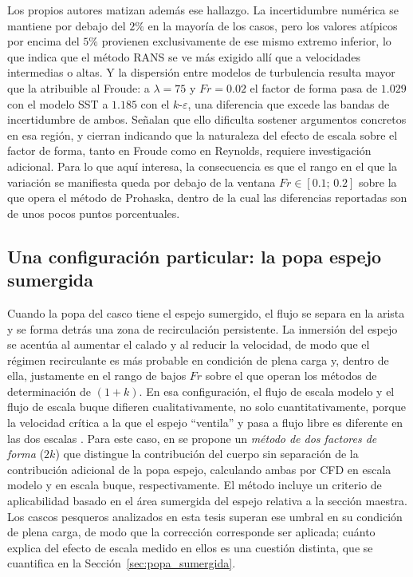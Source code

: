 Los propios autores matizan además ese hallazgo. La incertidumbre numérica se
mantiene por debajo del $2\%$ en la mayoría de los casos, pero los valores
atípicos por encima del $5\%$ provienen exclusivamente de ese mismo extremo
inferior, lo que indica que el método RANS se ve más exigido allí que a
velocidades intermedias o altas. Y la dispersión entre modelos de turbulencia
resulta mayor que la atribuible al Froude: a $\lambda = 75$ y $Fr = 0.02$ el
factor de forma pasa de $1.029$ con el modelo SST a $1.185$ con el
$k$-$\varepsilon$, una diferencia que excede las bandas de incertidumbre de ambos.
Señalan que ello dificulta sostener argumentos concretos en esa región, y cierran
indicando que la naturaleza del efecto de escala sobre el factor de forma, tanto
en Froude como en Reynolds, requiere investigación adicional. Para lo que aquí
interesa, la consecuencia es que el rango en el que la variación se manifiesta
queda por debajo de la ventana $Fr \in [0.1;\, 0.2]$ sobre la que opera el método
de Prohaska, dentro de la cual las diferencias reportadas son de unos pocos puntos porcentuales.

\subsection{Una configuración particular: la popa espejo sumergida}

Cuando la popa del casco tiene el espejo sumergido, el flujo se separa en la arista y se forma detrás una zona de recirculación persistente. La inmersión del espejo se acentúa al aumentar el calado y al reducir la velocidad, de modo que el régimen recirculante es más probable en condición de plena carga y, dentro de ella, justamente en el rango de bajos $Fr$ sobre el que operan los métodos de determinación de $(1+k)$. En esa configuración, el flujo de escala modelo y el flujo de escala buque difieren cualitativamente, no solo cuantitativamente, porque la velocidad crítica a la que el espejo ``ventila'' y pasa a flujo libre es diferente en las dos escalas \citep{ITTC_Combined_2021}. Para este caso, en \citet{korkmaz_wetted_transom} se propone un \emph{método de dos factores de forma} ($2k$) que distingue la contribución del cuerpo sin separación de la contribución adicional de la popa espejo, calculando ambas por CFD en escala modelo y en escala buque, respectivamente. El método incluye un criterio de aplicabilidad basado en el área sumergida del espejo relativa a la sección maestra. Los cascos pesqueros analizados en esta tesis superan ese umbral en su condición de plena carga, de modo que la corrección corresponde ser aplicada; cuánto explica del efecto de escala medido en ellos es una cuestión distinta, que se cuantifica en la Sección~\ref{sec:popa_sumergida}.

